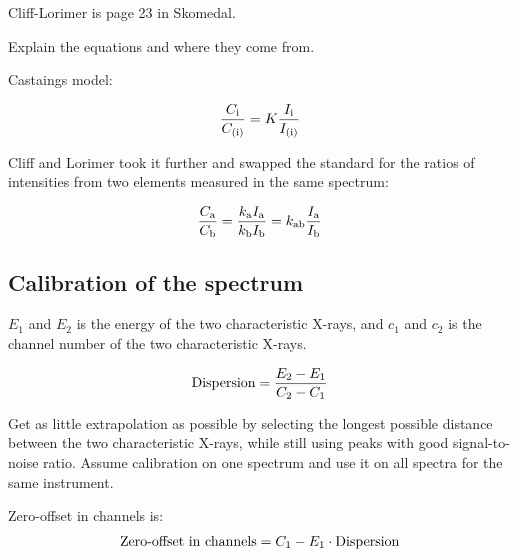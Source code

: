 Cliff-Lorimer is page 23 in Skomedal.

Explain the equations and where they come from.

Castaings model:

\begin{equation}
    \frac{C_\textnormal{i}}{C_\textnormal{(i)}} = K \frac{I_\textnormal{i}}{I_\textnormal{(i)}}
\end{equation}

Cliff and Lorimer took it further and swapped the standard for the ratios of intensities from two elements measured in the same spectrum:

\begin{equation}
    \frac{C_\textnormal{a}}{C_\textnormal{b}} = \frac{k_\textnormal{a} I_\textnormal{a}}{k_\textnormal{b} I_\textnormal{b}} = k_\textnormal{ab}  \frac{I_\textnormal{a}}{I_\textnormal{b}}
\end{equation}



%
\subsection{Calibration of the spectrum}
\label{sec:theory:calibration}




$E_1$ and $E_2$ is the energy of the two characteristic X-rays, and $c_1$ and $c_2$ is the channel number of the two characteristic X-rays.

\begin{equation}
    \label{eq:theory:calibration:dispersion}
    \textnormal{Dispersion} = \frac{E_2 - E_1}{C_2 - C_1}
\end{equation}

Get as little extrapolation as possible by selecting the longest possible distance between the two characteristic X-rays, while still using peaks with good signal-to-noise ratio.
Assume calibration on one spectrum and use it on all spectra for the same instrument.


Zero-offset in channels is:
\begin{equation}
    \label{eq:theory:calibration:offset}
    \textnormal{Zero-offset in channels} = C_1 - E_1 \cdot \textnormal{Dispersion}
\end{equation}

